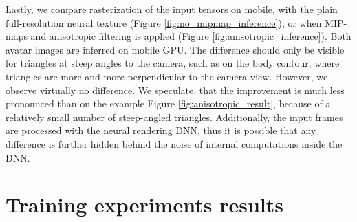 Lastly, we compare rasterization of the input tensors on mobile, with the plain full-resolution neural texture (Figure \ref{fig:no_mipmap_inference}), or when MIP-maps and anisotropic filtering is applied (Figure \ref{fig:anisotropic_inference}). Both avatar images are inferred on mobile GPU. The difference should only be visible for triangles at steep angles to the camera, such as on the body contour, where triangles are more and more perpendicular to the camera view. However, we observe virtually no difference. We speculate, that the improvement is much less pronounced than on the example Figure \ref{fig:anisotropic_result}, because of a relatively small number of steep-angled triangles. Additionally, the input frames are processed with the neural rendering  DNN, thus it is possible that any difference is further hidden behind the noise of internal computations inside the DNN.

\section{Training experiments results}\label{res:training}




